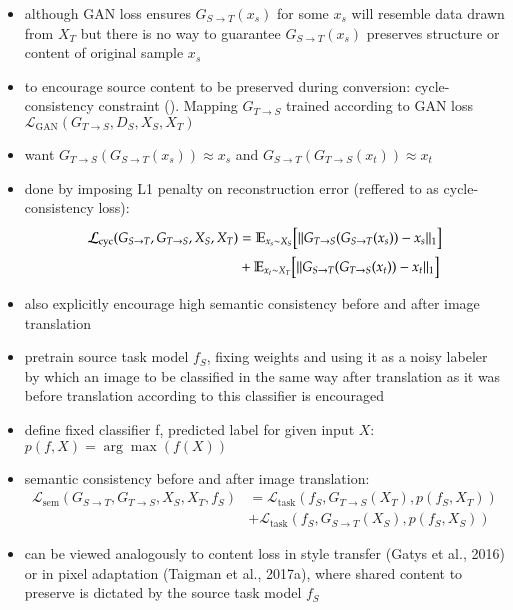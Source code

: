 \begin{itemize}
	\item although GAN loss ensures $G_{S\rightarrow T}(x_s)$ for some $x_s$ will resemble data drawn from $X_T$ but there is no way to guarantee $G_{S\rightarrow T}(x_s)$ preserves structure or content of original sample $x_s$
	\item to encourage source content to be preserved during conversion: cycle-consistency constraint (). Mapping $G_{T \rightarrow S}$ trained according to GAN loss $\mathcal{L}_{\text{GAN}}(G_{T \rightarrow S}, D_S, X_S, X_T)$
	\item want $G_{T \rightarrow S}(G_{S \rightarrow T}(x_s)) \approx x_s$ and $G_{S \rightarrow T}(G_{T \rightarrow S}(x_t)) \approx x_t$
	\item done by imposing L1 penalty on reconstruction error (reffered to as cycle-consistency loss):
	\begin{align}
		\mathcal{L}_{\text{cyc}}(G_{S\rightarrow T}, G_{T\rightarrow S}, X_S, X_T) &= \mathbb{E}_{x_s \sim X_S} \Bigl[\lVert G_{T\rightarrow S}(G_{S\rightarrow T}(x_s)) - x_s\rVert_1\Bigr]\\
		&+ \mathbb{E}_{x_t \sim X_T} \Bigl[\lVert G_{S\rightarrow T}(G_{T\rightarrow S}(x_t)) - x_t\rVert_1\Bigr]
	\end{align}
	\item also explicitly encourage high semantic consistency before and after image translation
	\item pretrain source task model $f_S$, fixing weights and using it as a noisy labeler by which an image to be classified in the same way after translation as it was before translation according to this classifier is encouraged
	\item define fixed classifier f, predicted label for given input $X$: $p(f,X) = \arg \max(f(X))$
	\item semantic consistency before and after image translation:
	\begin{align}
		\mathcal{L}_{\text{sem}}(G_{S\rightarrow T}, G_{T\rightarrow S}, X_S, X_T, f_S) &= \mathcal{L}_{\text{task}}(f_S, G_{T\rightarrow S}(X_T), p(f_S, X_T))\\
		&+ \mathcal{L}_{\text{task}}(f_S, G_{S\rightarrow T}(X_S), p(f_S, X_S))
	\end{align}
	\item can be viewed analogously to content loss in style transfer (Gatys et al., 2016) or in pixel adaptation (Taigman et al., 2017a), where shared content to preserve is dictated by the source task model $f_S$

\end{itemize}
